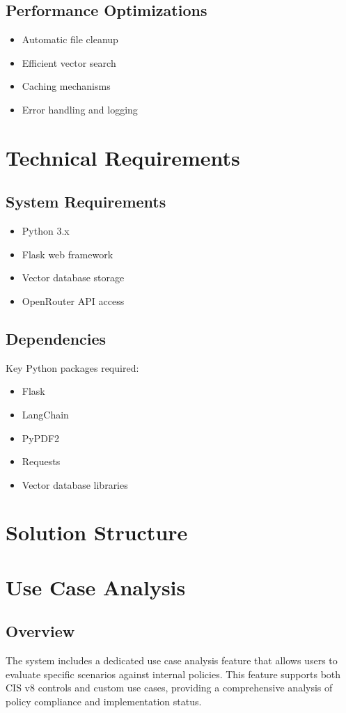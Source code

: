 \documentclass[11pt,a4paper]{article}
\begin{document}
\subsection{Performance Optimizations}
\begin{itemize}
    \item Automatic file cleanup
    \item Efficient vector search
    \item Caching mechanisms
    \item Error handling and logging
\end{itemize}

\section{Technical Requirements}
\subsection{System Requirements}
\begin{itemize}
    \item Python 3.x
    \item Flask web framework
    \item Vector database storage
    \item OpenRouter API access
\end{itemize}

\subsection{Dependencies}
Key Python packages required:
\begin{itemize}
    \item Flask
    \item LangChain
    \item PyPDF2
    \item Requests
    \item Vector database libraries
\end{itemize}

\section{Solution Structure}


\section{Use Case Analysis}
\subsection{Overview}
The system includes a dedicated use case analysis feature that allows users to evaluate specific scenarios against internal policies. This feature supports both CIS v8 controls and custom use cases, providing a comprehensive analysis of policy compliance and implementation status.
\end{document}

